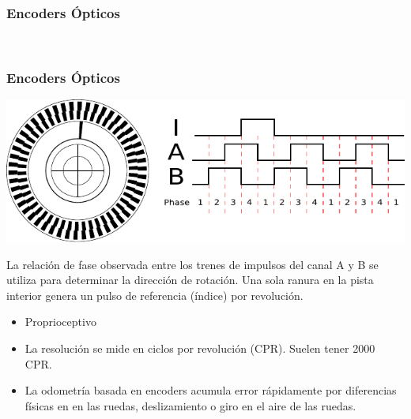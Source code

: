 \begin{frame}
    \frametitle{Encoders Ópticos}
    
    \begin{figure}[!h]
        \centering
        \\
    \end{figure}
\end{frame}

\begin{frame}
    \frametitle{Encoders Ópticos}

    \includegraphics[width=\columnwidth]{images/encoder.pdf}
    \footnotesize

    La relación de fase observada entre los trenes de impulsos del canal A y B se utiliza para determinar la dirección de rotación. Una sola ranura en la pista interior genera un pulso de referencia (índice) por revolución.

    \begin{itemize}
        \item Proprioceptivo
        \item La resolución se mide en ciclos por revolución (CPR). Suelen tener 2000 CPR.
        \item La odometría basada en encoders acumula error rápidamente por diferencias físicas en en las ruedas, deslizamiento o giro en el aire de las ruedas.
    \end{itemize}
\end{frame}



